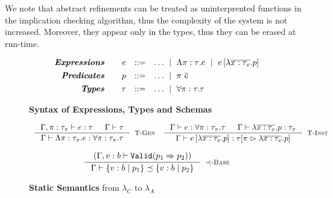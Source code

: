 We note that
abstract refinements 
can be treated as uninterprented functions in the implication
checking algorithm, thus the complexity of the system is not increased.
Moreover, they appear only in the types, thus they can be erased at run-time.
\begin{figure}[ht!]
\centering
$$
\begin{array}{rrcl}
\emphbf{Expressions} \quad 
  & e 
  & ::= 
  & 		 \dots
  \spmid \epabs{\rvar}{\tau}{e}
  \spmid \epapp{e}{\efunbar{x:\tau_x}{p}} 
  \\[0.05in] 

\emphbf{Predicates} \quad 
  & p
  & ::= 
  &		\dots
  \spmid \rvapp{\rvar}{e}  
  \\[0.05in] 
\emphbf{Types} \quad 
  & \tau 
  & ::= 
  &		 \dots
  \spmid \tpabs{\rvar}{\tau}{\tau}

\end{array}
$$
\caption{\textbf{Syntax of Expressions, Types and Schemas}}
\label{fig:syntax}
\end{figure}


\begin{figure}[ht!]

\medskip {}
$$\begin{array}{cc}
\inference
    {\hastype{\Gamma, \rvar:\tau_\rvar}{e}{\tau} &&
     \isWellFormed{\Gamma}{\tau} 
    }
    {\hastype{\Gamma}{\epabs{\rvar}{\tau_\rvar}{e}}{\tpabs{\rvar}{\tau_\rvar}{\tau}}}
    [\tpgen]
&  

\inference
    {\hastype{\Gamma}{e}{\tpabs{\rvar}{\tau_\rvar}{\tau}} && 
     \hastype{\Gamma}{\efunbar{x:\tau_x}{p}}{\tau_\rvar}
    }
    {\hastype{\Gamma}
             {\epapp{e}{\efunbar{x:\tau_x}{p}}}
             {\rpinst{\tau}{\rvar}{\efunbar{x:\tau_x}{p}}}
    }
    [\tpinst]
\end{array}$$

\medskip {}
$$
\inference
   {(\Gamma, v:b \vdash \texttt{Valid}(p_1 \Rightarrow p_2))}
   {\isSubType{\Gamma}{\tref{b}{p_1}}{\tref{b}{p_2}}}
   [\tsubBase]
$$
\caption{\textbf{Static Semantics} from $\lambda_C$ to $\lambda_A$}
\label{fig:rules}
\end{figure}
